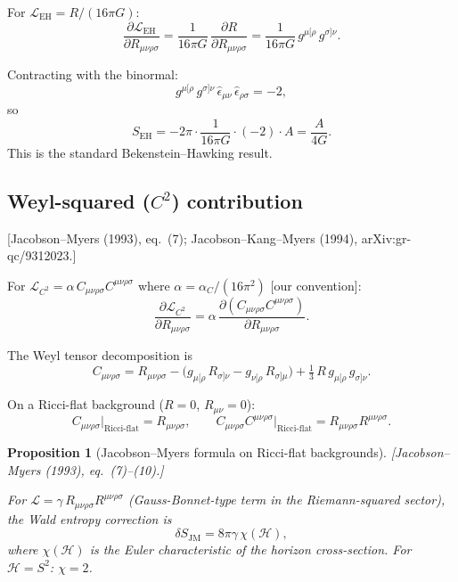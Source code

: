 \documentclass[12pt,a4paper]{article}
\newtheorem{proposition}{Proposition}[section]
\theoremstyle{definition}
\theoremstyle{remark}
\newcommand{\Rsq}{R_{\mu\nu\rho\sigma}R^{\mu\nu\rho\sigma}}
\newcommand{\Weylsq}{C_{\mu\nu\rho\sigma}C^{\mu\nu\rho\sigma}}
\newcommand{\fromlit}[1]{\textcolor{blue!70!black}{\textsf{[#1]}}}
\newcommand{\oursign}{\textcolor{teal!80!black}{\textsf{[our convention]}}}
\begin{document}
For $\mathcal{L}_{\mathrm{EH}} = R/(16\pi G)$:
\begin{equation}
  \frac{\partial\mathcal{L}_{\mathrm{EH}}}
  {\partial R_{\mu\nu\rho\sigma}}
  = \frac{1}{16\pi G}\,
  \frac{\partial R}{\partial R_{\mu\nu\rho\sigma}}
  = \frac{1}{16\pi G}\,
  g^{\mu[\rho}\,g^{\sigma]\nu}.
\end{equation}

Contracting with the binormal:
\begin{equation}
  g^{\mu[\rho}\,g^{\sigma]\nu}\,
  \hat{\epsilon}_{\mu\nu}\,\hat{\epsilon}_{\rho\sigma}
  = -2,
\end{equation}
so
\begin{equation}
  S_{\mathrm{EH}} = -2\pi \cdot \frac{1}{16\pi G} \cdot (-2)
  \cdot A = \frac{A}{4G}.
\end{equation}
This is the standard Bekenstein--Hawking result.

\subsection{Weyl-squared ($C^2$) contribution}
\label{sec:wald-weyl}
\fromlit{Jacobson--Myers (1993), eq.~(7);
Jacobson--Kang--Myers (1994), arXiv:gr-qc/9312023.}

For $\mathcal{L}_{C^2} = \alpha\,\Weylsq$ where
$\alpha = \alpha_C/(16\pi^2)$ \oursign:
\begin{equation}
  \frac{\partial\mathcal{L}_{C^2}}
  {\partial R_{\mu\nu\rho\sigma}}
  = \alpha\,\frac{\partial(\Weylsq)}
  {\partial R_{\mu\nu\rho\sigma}}.
\end{equation}

The Weyl tensor decomposition is
\begin{equation}\label{eq:weyl-decomp}
  C_{\mu\nu\rho\sigma} = R_{\mu\nu\rho\sigma}
  - \bigl(g_{\mu[\rho}\,R_{\sigma]\nu}
  - g_{\nu[\rho}\,R_{\sigma]\mu}\bigr)
  + \tfrac{1}{3}\,R\,g_{\mu[\rho}\,g_{\sigma]\nu}.
\end{equation}

On a Ricci-flat background ($R = 0$, $R_{\mu\nu} = 0$):
\begin{equation}
  C_{\mu\nu\rho\sigma}\big|_{\mathrm{Ricci\text{-}flat}}
  = R_{\mu\nu\rho\sigma},
  \qquad
  \Weylsq\big|_{\mathrm{Ricci\text{-}flat}}
  = \Rsq.
\end{equation}

\begin{proposition}[Jacobson--Myers formula on Ricci-flat backgrounds]
\label{prop:JM}
\fromlit{Jacobson--Myers (1993), eq.~(7)--(10).}

For $\mathcal{L} = \gamma\,\Rsq$ (Gauss-Bonnet-type term
in the Riemann-squared sector), the Wald entropy correction is
\begin{equation}\label{eq:JM-formula}
  \delta S_{\mathrm{JM}} = 8\pi\gamma\,\chi(\mathcal{H}),
\end{equation}
where $\chi(\mathcal{H})$ is the Euler characteristic of the horizon
cross-section.  For $\mathcal{H} = S^2$: $\chi = 2$.
\end{proposition}
\end{document}

